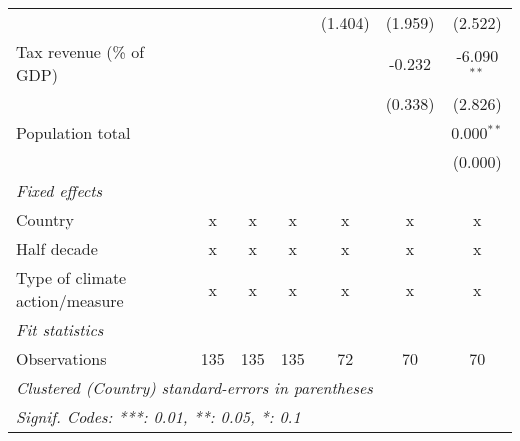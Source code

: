 \begin{tabular}{lcccccc}
                                                         &              &              &              & (1.404)      & (1.959)         & (2.522)\\   
   Tax revenue (\% of GDP)                               &              &              &              &              & -0.232          & -6.090$^{**}$\\   
                                                         &              &              &              &              & (0.338)         & (2.826)\\   
   Population total                                      &              &              &              &              &                 & 0.000$^{**}$\\   
                                                         &              &              &              &              &                 & (0.000)\\   
   \emph{Fixed effects}\\
   Country                                               & x            & x            & x            & x            & x               & x\\  
   Half decade                                           & x            & x            & x            & x            & x               & x\\  
   Type of climate action/measure                        & x            & x            & x            & x            & x               & x\\  
   \midrule \emph{Fit statistics}\\
   Observations                                          & 135          & 135          & 135          & 72           & 70              & 70\\  
   \midrule
   \multicolumn{7}{l}{\emph{Clustered (Country) standard-errors in parentheses}}\\
   \multicolumn{7}{l}{\emph{Signif. Codes: ***: 0.01, **: 0.05, *: 0.1}}\\
\end{tabular}
\par\endgroup


